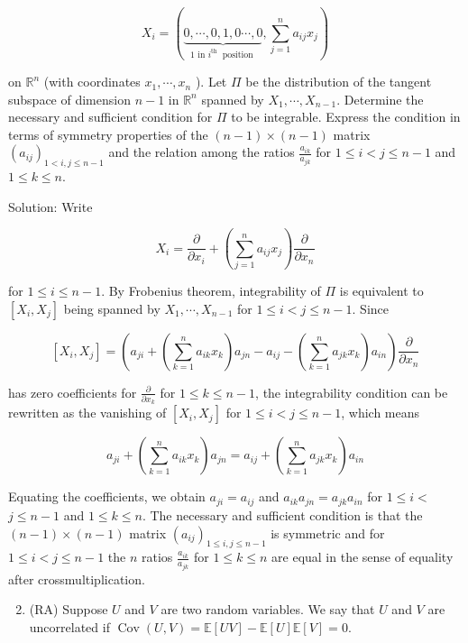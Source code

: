 \documentclass[10pt]{article}
\begin{document}
$$
X_{i}=(\underbrace{0, \cdots, 0,1,0 \cdots, 0}_{1 \text { in } i^{\text {th }} \text { position }}, \sum_{j=1}^{n} a_{i j} x_{j})
$$

on $\mathbb{R}^{n}$ (with coordinates $x_{1}, \cdots, x_{n}$ ). Let $\Pi$ be the distribution of the tangent subspace of dimension $n-1$ in $\mathbb{R}^{n}$ spanned by $X_{1}, \cdots, X_{n-1}$. Determine the necessary and sufficient condition for $\Pi$ to be integrable. Express the condition in terms of symmetry properties of the $(n-1) \times(n-1)$ matrix $\left(a_{i j}\right)_{1<i, j \leq n-1}$ and the relation among the ratios $\frac{a_{i k}}{a_{j k}}$ for $1 \leq i<j \leq n-1$ and $1 \leq k \leq n$.

Solution: Write

$$
X_{i}=\frac{\partial}{\partial x_{i}}+\left(\sum_{j=1}^{n} a_{i j} x_{j}\right) \frac{\partial}{\partial x_{n}}
$$

for $1 \leq i \leq n-1$. By Frobenius theorem, integrability of $\Pi$ is equivalent to $\left[X_{i}, X_{j}\right]$ being spanned by $X_{1}, \cdots, X_{n-1}$ for $1 \leq i<j \leq n-1$. Since

$$
\left[X_{i}, X_{j}\right]=\left(a_{j i}+\left(\sum_{k=1}^{n} a_{i k} x_{k}\right) a_{j n}-a_{i j}-\left(\sum_{k=1}^{n} a_{j k} x_{k}\right) a_{i n}\right) \frac{\partial}{\partial x_{n}}
$$

has zero coefficients for $\frac{\partial}{\partial x_{k}}$ for $1 \leq k \leq n-1$, the integrability condition can be rewritten as the vanishing of $\left[X_{i}, X_{j}\right]$ for $1 \leq i<j \leq n-1$, which means

$$
a_{j i}+\left(\sum_{k=1}^{n} a_{i k} x_{k}\right) a_{j n}=a_{i j}+\left(\sum_{k=1}^{n} a_{j k} x_{k}\right) a_{i n}
$$

Equating the coefficients, we obtain $a_{j i}=a_{i j}$ and $a_{i k} a_{j n}=a_{j k} a_{i n}$ for $1 \leq i<$ $j \leq n-1$ and $1 \leq k \leq n$. The necessary and sufficient condition is that the $(n-1) \times(n-1)$ matrix $\left(a_{i j}\right)_{1 \leq i, j \leq n-1}$ is symmetric and for $1 \leq i<j \leq n-1$ the $n$ ratios $\frac{a_{i k}}{a_{j k}}$ for $1 \leq k \leq n$ are equal in the sense of equality after crossmultiplication.

\begin{enumerate}
  \setcounter{enumi}{1}
  \item (RA) Suppose $U$ and $V$ are two random variables. We say that $U$ and $V$ are uncorrelated if $\operatorname{Cov}(U, V)=\mathbb{E}[U V]-\mathbb{E}[U] \mathbb{E}[V]=0$.
\end{enumerate}
\end{document}
